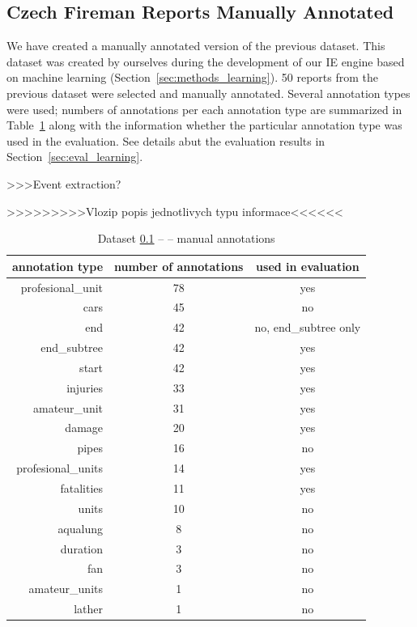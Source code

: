 \subsection{Czech Fireman Reports Manually Annotated} \label{sec:ch40_fireman_annotated}

We have created a manually annotated version of the previous dataset. 
This dataset was created by ourselves during the development of our IE  engine based on machine learning (Section~\ref{sec:methods_learning}). 50 reports from the previous dataset were selected and manually annotated. 
 Several annotation types were used; numbers of annotations per each annotation type are summarized in Table~\ref{tab:ch40_fire_with} along with the information whether the particular annotation type was used in the evaluation. See details abut the evaluation results in Section~\ref{sec:eval_learning}. 



>>>Event extraction?

>>>>>>>>>Vlozip popis jednotlivych typu informace<<<<<<

\begin{table}
\centering
\begin{tabular}{|r||c|c|}
\hline
\textbf{annotation type} & \textbf{number of annotations} & \textbf{used in evaluation}\\
\hline
\hline
profesional\_unit & 78 & yes\\
\hline
cars & 45 & no\\
\hline
end & 42 & no, end\_subtree only\\
\hline
end\_subtree & 42 & yes\\
\hline
start & 42 & yes\\
\hline
injuries & 33 & yes\\
\hline
amateur\_unit & 31 & yes\\
\hline
damage & 20 & yes\\
\hline
pipes & 16 & no\\
\hline
profesional\_units & 14 & yes\\
\hline
fatalities & 11 & yes\\
\hline
units & 10 & no\\
\hline
aqualung & 8 & no\\
\hline
duration & 3 & no\\
\hline
fan & 3 & no\\
\hline
amateur\_units & 1 & no\\
\hline
lather & 1 & no\\
\hline
\end{tabular}
\caption{Dataset \ref{sec:ch40_fireman_annotated} --  -- manual annotations} \label{tab:ch40_fire_with}
\end{table}








